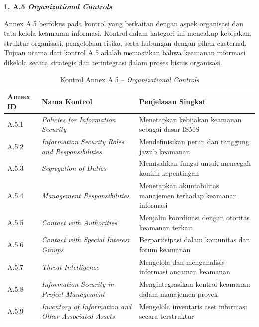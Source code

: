 \vspace{4pt}
\noindent\textbf{1. A.5 \textit{Organizational Controls}}

Annex A.5 berfokus pada kontrol yang berkaitan dengan aspek organisasi dan tata kelola keamanan informasi. Kontrol dalam kategori ini mencakup kebijakan, struktur organisasi, pengelolaan risiko, serta hubungan dengan pihak eksternal. Tujuan utama dari kontrol A.5 adalah memastikan bahwa keamanan informasi dikelola secara strategis dan terintegrasi dalam proses bisnis organisasi.

\begin{table}[H]
\centering
\small
\caption{Kontrol Annex A.5 -- \textit{Organizational Controls} \cite{isoiec20227001}}
\label{tab:annex_a5}
\begin{tabular}{|P{1.6cm}|P{5.0cm}|P{6.4cm}|}
\hline
\textbf{Annex ID} & \textbf{Nama Kontrol} & \textbf{Penjelasan Singkat} \\
\hline
A.5.1  & \textit{Policies for Information Security}                              & Menetapkan kebijakan keamanan sebagai dasar ISMS \\
\hline
A.5.2  & \textit{Information Security Roles and Responsibilities}                & Mendefinisikan peran dan tanggung jawab keamanan \\
\hline
A.5.3  & \textit{Segregation of Duties}                                          & Memisahkan fungsi untuk mencegah konflik kepentingan \\
\hline
A.5.4  & \textit{Management Responsibilities}                                    & Menetapkan akuntabilitas manajemen terhadap keamanan informasi \\
\hline
A.5.5  & \textit{Contact with Authorities}                                       & Menjalin koordinasi dengan otoritas keamanan terkait \\
\hline
A.5.6  & \textit{Contact with Special Interest Groups}                           & Berpartisipasi dalam komunitas dan forum keamanan \\
\hline
A.5.7  & \textit{Threat Intelligence}                                            & Mengelola dan menganalisis informasi ancaman keamanan \\
\hline
A.5.8  & \textit{Information Security in Project Management}                     & Mengintegrasikan kontrol keamanan dalam manajemen proyek \\
\hline
A.5.9  & \textit{Inventory of Information and Other Associated Assets}           & Mengelola inventaris aset informasi secara terstruktur \\
\hline

\end{tabular}
\end{table}


